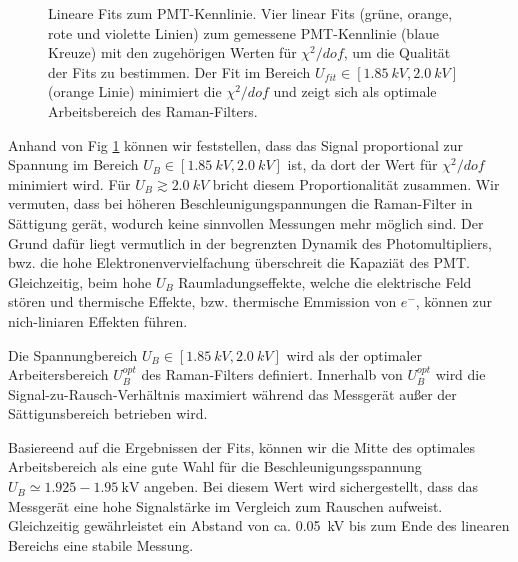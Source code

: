 \documentclass[11pt]{article}
\begin{document}
\begin{figure}[htbp]
	\centering
   \caption{Lineare Fits zum PMT-Kennlinie. Vier linear Fits (grüne, orange, rote und violette Linien) zum gemessene PMT-Kennlinie (blaue Kreuze) mit den zugehörigen Werten für $\chi^2 / dof$, um die Qualität der Fits zu bestimmen. Der Fit im Bereich $U_{fit} \in [\SI{1.85}{kV}, \SI{2.0}{kV}]$ (orange Linie) minimiert die $\chi^2 / dof$ und zeigt sich als optimale Arbeitsbereich des Raman-Filters.}
   \label{fig:pmt-fit}
\end{figure}

Anhand von Fig \ref{fig:pmt-fit} können wir feststellen, dass das Signal proportional zur Spannung im Bereich $U_B \in [\SI{1.85}{kV}, \SI{2.0}{kV}]$ ist, da dort der Wert für $\chi^2/dof$ minimiert wird. Für $U_B \gtrsim \SI{2.0}{kV}$ bricht diesem Proportionalität zusammen. Wir vermuten, dass bei höheren Beschleunigungspannungen die Raman-Filter in Sättigung gerät, wodurch keine sinnvollen Messungen mehr möglich sind. Der Grund dafür liegt vermutlich in der begrenzten Dynamik des Photomultipliers, bwz. die hohe Elektronenvervielfachung überschreit die Kapaziät des PMT. Gleichzeitig, beim hohe $U_B$ Raumladungseffekte, welche die elektrische Feld stören und thermische Effekte, bzw. thermische Emmission von $e^-$, können zur nich-liniaren Effekten führen.

Die Spannungbereich $U_B \in [\SI{1.85}{kV}, \SI{2.0}{kV}]$ wird als der optimaler Arbeitersbereich $U_B^{opt}$ des Raman-Filters definiert. Innerhalb von $U_B^{opt}$ wird die Signal-zu-Rausch-Verhältnis maximiert während das Messgerät außer der Sättigunsbereich betrieben wird.

Basiereend auf die Ergebnissen der Fits, können wir die Mitte des optimales Arbeitsbereich als eine gute Wahl für die Beschleunigungsspannung $U_B \simeq \num{1.925}-\SI{1.95}{\kilo\volt}$ angeben. Bei diesem Wert wird sichergestellt, dass das Messgerät eine hohe Signalstärke im Vergleich zum Rauschen aufweist. Gleichzeitig gewährleistet ein Abstand von ca. \SI{0.05}{kV} bis zum Ende des linearen Bereichs eine stabile Messung.
\end{document}
